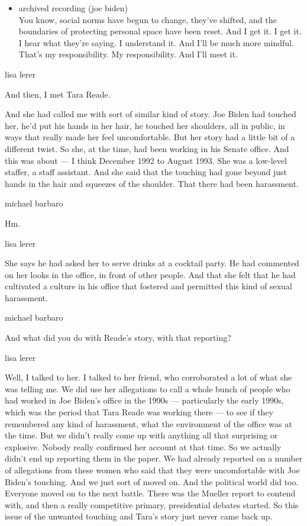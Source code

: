 \begin{itemize}
\tightlist
\item
  archived recording (joe biden)\\
  You know, social norms have begun to change, they've shifted, and the
  boundaries of protecting personal space have been reset. And I get it.
  I get it. I hear what they're saying. I understand it. And I'll be
  much more mindful. That's my responsibility. My responsibility. And
  I'll meet it.
\end{itemize}

lisa lerer

And then, I met Tara Reade.

And she had called me with sort of similar kind of story. Joe Biden had
touched her, he'd put his hands in her hair, he touched her shoulders,
all in public, in ways that really made her feel uncomfortable. But her
story had a little bit of a different twist. So she, at the time, had
been working in his Senate office. And this was about --- I think
December 1992 to August 1993. She was a low-level staffer, a staff
assistant. And she said that the touching had gone beyond just hands in
the hair and squeezes of the shoulder. That there had been harassment.

michael barbaro

Hm.

lisa lerer

She says he had asked her to serve drinks at a cocktail party. He had
commented on her looks in the office, in front of other people. And that
she felt that he had cultivated a culture in his office that fostered
and permitted this kind of sexual harassment.

michael barbaro

And what did you do with Reade's story, with that reporting?

lisa lerer

Well, I talked to her. I talked to her friend, who corroborated a lot of
what she was telling me. We did use her allegations to call a whole
bunch of people who had worked in Joe Biden's office in the 1990s ---
particularly the early 1990s, which was the period that Tara Reade was
working there --- to see if they remembered any kind of harassment, what
the environment of the office was at the time. But we didn't really come
up with anything all that surprising or explosive. Nobody really
confirmed her account at that time. So we actually didn't end up
reporting them in the paper. We had already reported on a number of
allegations from these women who said that they were uncomfortable with
Joe Biden's touching. And we just sort of moved on. And the political
world did too. Everyone moved on to the next battle. There was the
Mueller report to contend with, and then a really competitive primary,
presidential debates started. So this issue of the unwanted touching and
Tara's story just never came back up.

